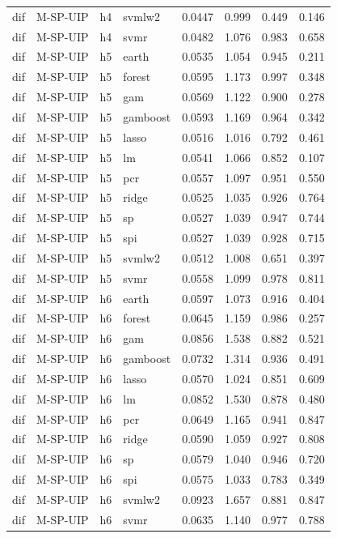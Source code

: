 \begin{ThreePartTable}
\begin{longtable}[t]{llclcccc}
dif & M-SP-UIP & h4 & svmlw2 & 0.0447 & 0.999 & 0.449 & 0.146\\
dif & M-SP-UIP & h4 & svmr & 0.0482 & 1.076 & 0.983 & 0.658\\
\addlinespace
dif & M-SP-UIP & h5 & earth & 0.0535 & 1.054 & 0.945 & 0.211\\
dif & M-SP-UIP & h5 & forest & 0.0595 & 1.173 & 0.997 & 0.348\\
dif & M-SP-UIP & h5 & gam & 0.0569 & 1.122 & 0.900 & 0.278\\
dif & M-SP-UIP & h5 & gamboost & 0.0593 & 1.169 & 0.964 & 0.342\\
dif & M-SP-UIP & h5 & lasso & 0.0516 & 1.016 & 0.792 & 0.461\\
dif & M-SP-UIP & h5 & lm & 0.0541 & 1.066 & 0.852 & 0.107\\
dif & M-SP-UIP & h5 & pcr & 0.0557 & 1.097 & 0.951 & 0.550\\
dif & M-SP-UIP & h5 & ridge & 0.0525 & 1.035 & 0.926 & 0.764\\
dif & M-SP-UIP & h5 & sp & 0.0527 & 1.039 & 0.947 & 0.744\\
dif & M-SP-UIP & h5 & spi & 0.0527 & 1.039 & 0.928 & 0.715\\
dif & M-SP-UIP & h5 & svmlw2 & 0.0512 & 1.008 & 0.651 & 0.397\\
dif & M-SP-UIP & h5 & svmr & 0.0558 & 1.099 & 0.978 & 0.811\\
\addlinespace
dif & M-SP-UIP & h6 & earth & 0.0597 & 1.073 & 0.916 & 0.404\\
dif & M-SP-UIP & h6 & forest & 0.0645 & 1.159 & 0.986 & 0.257\\
dif & M-SP-UIP & h6 & gam & 0.0856 & 1.538 & 0.882 & 0.521\\
dif & M-SP-UIP & h6 & gamboost & 0.0732 & 1.314 & 0.936 & 0.491\\
dif & M-SP-UIP & h6 & lasso & 0.0570 & 1.024 & 0.851 & 0.609\\
dif & M-SP-UIP & h6 & lm & 0.0852 & 1.530 & 0.878 & 0.480\\
dif & M-SP-UIP & h6 & pcr & 0.0649 & 1.165 & 0.941 & 0.847\\
dif & M-SP-UIP & h6 & ridge & 0.0590 & 1.059 & 0.927 & 0.808\\
dif & M-SP-UIP & h6 & sp & 0.0579 & 1.040 & 0.946 & 0.720\\
dif & M-SP-UIP & h6 & spi & 0.0575 & 1.033 & 0.783 & 0.349\\
dif & M-SP-UIP & h6 & svmlw2 & 0.0923 & 1.657 & 0.881 & 0.847\\
dif & M-SP-UIP & h6 & svmr & 0.0635 & 1.140 & 0.977 & 0.788\\

\end{longtable}
\end{ThreePartTable}
